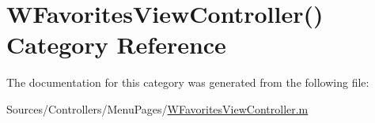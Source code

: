 \hypertarget{category_w_favorites_view_controller_07_08}{\section{W\-Favorites\-View\-Controller() Category Reference}
\label{category_w_favorites_view_controller_07_08}
}


The documentation for this category was generated from the following file\-:\begin{DoxyCompactItemize}
\item 
Sources/\-Controllers/\-Menu\-Pages/\hyperlink{_w_favorites_view_controller_8m}{W\-Favorites\-View\-Controller.\-m}\end{DoxyCompactItemize}
